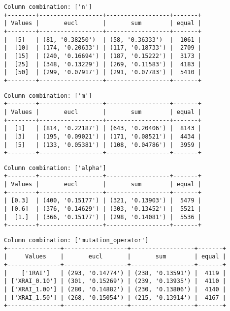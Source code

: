 \documentclass{article}
\begin{document}
\begin{verbatim}
Column combination: ['n']
+--------+------------------+------------------+-------+
| Values |       eucl       |       sum        | equal |
+--------+------------------+------------------+-------+
|  [5]   | (81, '0.38250')  | (58, '0.36333')  |  1061 |
|  [10]  | (174, '0.20633') | (117, '0.18733') |  2709 |
|  [15]  | (240, '0.16694') | (187, '0.15222') |  3173 |
|  [25]  | (348, '0.13229') | (269, '0.11583') |  4183 |
|  [50]  | (299, '0.07917') | (291, '0.07783') |  5410 |
+--------+------------------+------------------+-------+
\end{verbatim}

\begin{verbatim}
Column combination: ['m']
+--------+------------------+------------------+-------+
| Values |       eucl       |       sum        | equal |
+--------+------------------+------------------+-------+
|  [1]   | (814, '0.22187') | (643, '0.20406') |  8143 |
|  [3]   | (195, '0.09021') | (171, '0.08521') |  4434 |
|  [5]   | (133, '0.05381') | (108, '0.04786') |  3959 |
+--------+------------------+------------------+-------+
\end{verbatim}

\begin{verbatim}
Column combination: ['alpha']
+--------+------------------+------------------+-------+
| Values |       eucl       |       sum        | equal |
+--------+------------------+------------------+-------+
| [0.3]  | (400, '0.15177') | (321, '0.13903') |  5479 |
| [0.6]  | (376, '0.14629') | (303, '0.13452') |  5521 |
|  [1.]  | (366, '0.15177') | (298, '0.14081') |  5536 |
+--------+------------------+------------------+-------+
\end{verbatim}

\begin{verbatim}
Column combination: ['mutation_operator']
+---------------+------------------+------------------+-------+
|     Values    |       eucl       |       sum        | equal |
+---------------+------------------+------------------+-------+
|    ['1RAI']   | (293, '0.14774') | (238, '0.13591') |  4119 |
| ['XRAI_0.10'] | (301, '0.15269') | (239, '0.13935') |  4110 |
| ['XRAI_1.00'] | (280, '0.14882') | (230, '0.13806') |  4140 |
| ['XRAI_1.50'] | (268, '0.15054') | (215, '0.13914') |  4167 |
+---------------+------------------+------------------+-------+
\end{verbatim}
\end{document}
